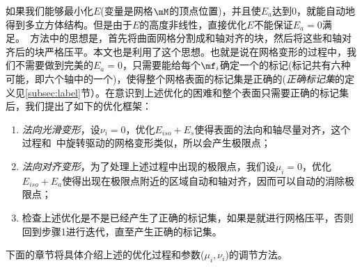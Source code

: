 如果我们能够最小化$E$(变量是网格$\mM$的顶点位置)，并且使$E_a$达到0，就能自动地得到多立方体结构。但是由于$E$的高度非线性，直接优化$E$不能保证$E_a=0$满足。~\cite{Gregson2011,Livesu2013}方法中的思想是，首先将曲面网格分割成和轴对齐的块，然后将这些和轴对齐后的块严格压平。本文也是利用了这个思想。也就是说在网格变形的过程中，我们不需要做到完美的$E_a=0$，只需要能给每个$\mf_i$确定一个的标记(标记共有六种可能，即六个轴中的一个)，使得整个网格表面的标记集是正确的(\emph{正确标记集}的定义见\ref{subsec:label}节）。在意识到上述优化的困难和整个表面只需要正确的标记集后，我们提出了如下的优化框架：
\begin{enumerate}
    \item \emph{法向光滑变形}，设$\nu_i=0$，优化$E_{iso} + E_s$使得表面的法向和轴尽量对齐，这个过程和~\cite{Gregson2011}中旋转驱动的网格变形类似，所以会产生极限点；
    \item \emph{法向对齐变形}，为了处理上述过程中出现的极限点，我们设$\mu_i=0$，优化$E_{iso} + E_a$使得出现在极限点附近的区域自动和轴对齐，因而可以自动的消除极限点；
    \item  检查上述优化是不是已经产生了正确的标记集，如果是就进行网格压平，否则回到步骤1进行迭代，直至产生正确的标记集。
\end{enumerate}
下面的章节将具体介绍上述的优化过程和参数($\mu_i,\nu_i$)的调节方法。

